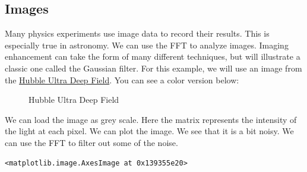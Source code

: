 \begin{Shaded}
\begin{Highlighting}[]
\end{Highlighting}
\end{Shaded}

\subsection{Images}\label{images}

Many physics experiments use image data to record their results. This is
especially true in astronomy. We can use the FFT to analyze images.
Imaging enhancement can take the form of many different techniques, but
will illustrate a classic one called the Gaussian filter. For this
example, we will use an image from the
\href{https://en.wikipedia.org/wiki/Hubble_Deep_Field}{Hubble Ultra Deep
Field}. You can see a color version below:

\begin{figure}
\centering
{}
\caption{Hubble Ultra Deep Field}
\end{figure}

We can load the image as grey scale. Here the matrix represents the
intensity of the light at each pixel. We can plot the image. We see that
it is a bit noisy. We can use the FFT to filter out some of the noise.

\begin{Shaded}
\begin{Highlighting}[]
\OperatorTok{=}\NormalTok{(}\NormalTok{)  }
\OperatorTok{=}\NormalTok{)}
\end{Highlighting}
\end{Shaded}

\begin{verbatim}
<matplotlib.image.AxesImage at 0x139355e20>
\end{verbatim}

